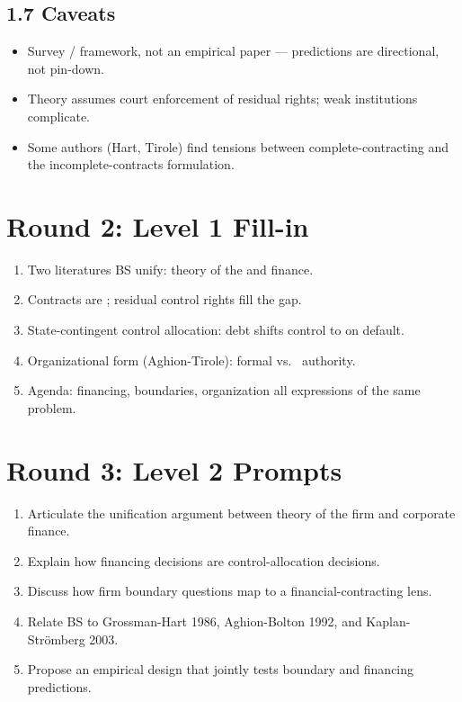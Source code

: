 \documentclass[11pt]{article}
\newcommand{\blank}[1]{\underline{\hspace{#1}}}
\begin{document}
\subsection*{1.7 Caveats}
\begin{alertbox}
\begin{itemize}
\item Survey / framework, not an empirical paper --- predictions are directional, not pin-down.
\item Theory assumes court enforcement of residual rights; weak institutions complicate.
\item Some authors (Hart, Tirole) find tensions between complete-contracting and the incomplete-contracts formulation.
\end{itemize}
\end{alertbox}

\section*{Round 2: Level 1 Fill-in}
\begin{enumerate}
\item Two literatures BS unify: theory of the \blank{1.5cm} and \blank{2cm} finance.
\item Contracts are \blank{2cm}; residual control rights fill the gap.
\item State-contingent control allocation: debt shifts control to \blank{2cm} on default.
\item Organizational form (Aghion-Tirole): formal vs.\ \blank{1.5cm} authority.
\item Agenda: financing, boundaries, organization all expressions of the same \blank{2cm} problem.
\end{enumerate}

\section*{Round 3: Level 2 Prompts}
\begin{enumerate}
\item Articulate the unification argument between theory of the firm and corporate finance.
\item Explain how financing decisions are control-allocation decisions.
\item Discuss how firm boundary questions map to a financial-contracting lens.
\item Relate BS to Grossman-Hart 1986, Aghion-Bolton 1992, and Kaplan-Strömberg 2003.
\item Propose an empirical design that jointly tests boundary and financing predictions.
\end{enumerate}
\end{document}
